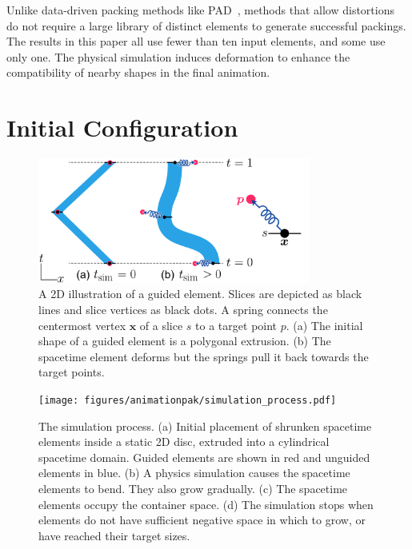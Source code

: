 Unlike data-driven packing methods like PAD~\cite{Kwan2016}, methods that
allow distortions do not require a large library of distinct elements
to generate successful packings.  The results in this paper all use
fewer than ten input elements, and some use only one.
The physical simulation induces deformation to enhance 
the compatibility of nearby shapes in the final animation.

\section{Initial Configuration}
\label{animationpak_initial_configuration}

\begin{figure}[t]
\centering
\includegraphics[width=0.8\textwidth]{figures/animationpak/guided_element.pdf} 
\caption[A 2D illustration of a guided element]{
\label{fig_animationpak_guided_element} A 2D illustration of a guided element.
Slices are depicted as black lines and slice vertices as black dots.
A spring connects the centermost vertex $\bm{x}$ of a slice $s$ to a target
point $p$.
(a) The initial shape of a guided element is a polygonal extrusion.
(b) The spacetime element deforms but the springs pull it back towards
the target points.}
\end{figure}

\begin{figure}[t]
\centering
\texttt{[image: figures/animationpak/simulation\_process.pdf]} 
\caption[AnimationPak simulation process]{
\label{fig_animationpak_simulation_process} The simulation process. 
(a) Initial placement of 
shrunken spacetime elements inside a static 2D disc, extruded into a 
cylindrical spacetime domain.
Guided elements are shown in red and unguided elements in blue.
(b) A physics simulation causes the spacetime elements to bend. They
also grow gradually.
(c) The spacetime elements occupy the container space.
(d) The simulation stops when elements do not have sufficient negative
space in which to grow, or have reached their target sizes.
}
\end{figure}

